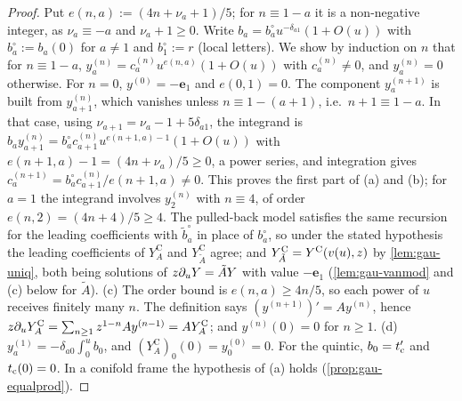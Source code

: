 \begin{proof}
Put $e(n,a):=(4n+\nu_a+1)/5$; for $n\equiv1-a$ it is a non-negative integer, as $\nu_a\equiv-a$ and $\nu_a+1\geq0$. Write $b_a=b^\circ_au^{-\delta_{a1}}(1+O(u))$ with $b^\circ_a:=b_a(0)$ for $a\neq1$ and $b^\circ_1:=r$ (local letters). We show by induction on $n$ that for $n\equiv1-a$, $y^{(n)}_a=c^{(n)}_au^{e(n,a)}(1+O(u))$ with $c^{(n)}_a\neq0$, and $y^{(n)}_a=0$ otherwise. For $n=0$, $y^{(0)}=-\mathbf e_1$ and $e(0,1)=0$. The component $y^{(n+1)}_a$ is built from $y^{(n)}_{a+1}$, which vanishes unless $n\equiv1-(a+1)$, i.e.\ $n+1\equiv1-a$. In that case, using $\nu_{a+1}=\nu_a-1+5\delta_{a1}$, the integrand is $b_ay^{(n)}_{a+1}=b^\circ_ac^{(n)}_{a+1}u^{e(n+1,a)-1}(1+O(u))$ with $e(n+1,a)-1=(4n+\nu_a)/5\geq0$, a power series, and integration gives $c^{(n+1)}_a=b^\circ_ac^{(n)}_{a+1}/e(n+1,a)\neq0$. This proves the first part of (a) and (b); for $a=1$ the integrand involves $y^{(n)}_2$ with $n\equiv4$, of order $e(n,2)=(4n+4)/5\geq4$. The pulled-back model satisfies the same recursion for the leading coefficients with $\tilde b^\circ_a$ in place of $b^\circ_a$, so under the stated hypothesis the leading coefficients of $Y^{\mathrm C}_A$ and $Y^{\mathrm C}_{\tilde A}$ agree; and $Y^{\mathrm C}_{\tilde A}=Y^{\mathrm{C}}(v(u),z)$ by \cref{lem:gau-uniq}, both being solutions of $z\partial_uY=\tilde AY$ with value $-\mathbf e_1$ (\cref{lem:gau-vanmod} and (c) below for $\tilde A$). (c) The order bound is $e(n,a)\geq4n/5$, so each power of $u$ receives finitely many $n$. The definition says $(y^{(n+1)})'=Ay^{(n)}$, hence $z\partial_uY^{\mathrm C}_A=\sum_{n\geq1}z^{1-n}Ay^{(n-1)}=AY^{\mathrm C}_A$; and $y^{(n)}(0)=0$ for $n\geq1$. (d) $y^{(1)}_a=-\delta_{a0}\int_0^ub_0$, and $(Y^{\mathrm C}_A)_0(0)=y^{(0)}_0=0$. For the quintic, $b_0=t_{\mathrm{c}}'$ and $t_{\mathrm{c}}(0)=0$. In a conifold frame the hypothesis of (a) holds (\cref{prop:gau-equalprod}).
\end{proof}


